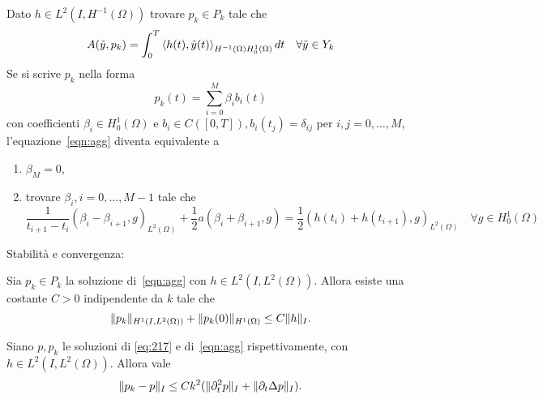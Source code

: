Dato $h\in L^2(I,H^{-1}(\Omega))$ trovare $p_k\in P_k$ tale che 
\begin{equation}
\label{eqn:agg}
A(\tilde{y},p_k)=\int^T_0 \Braket{h(t),\tilde{y}(t)}_{H^{-1}(\Omega)H^1_0(\Omega)}dt\quad\forall\tilde{y}\in Y_k
\end{equation}
Se si scrive $p_k$ nella forma 
\[
p_k(t)=\sum^M_{i=0}\beta_i b_i(t)
\]
con coefficienti $\beta_i\in H^1_0(\Omega)$ e $b_i\in C([0,T]), b_i(t_j)=\delta_{ij}$ per $i,j=0,\dots,M$, l'equazione~\eqref{eqn:agg} diventa equivalente a
\begin{enumerate}
\item $\beta_M=0$,
\item trovare $\beta_i,i=0,\dots,M-1$ tale che
\begin{equation}
\label{eqn:agg1}
\frac{1}{t_{i+1}-t_i}(\beta_i-\beta_{i+1},g)_{L^2(\Omega)} + \frac{1}{2}a(\beta_i+\beta_{i+1},g)=\frac{1}{2}(h(t_i)+h(t_{i+1}),g)_{L^2(\Omega)}\quad\forall g\in H^1_0(\Omega)
\end{equation}
\end{enumerate}
Stabilità e convergenza:
\begin{lemma}
\label{stab:agg}
Sia $p_k\in P_k$ la soluzione di~\eqref{eqn:agg} con $h\in L^2(I,L^2(\Omega))$. Allora esiste una costante $C>0$ indipendente da $k$ tale che
\[
\lVert p_k\rVert_{H^1(I,L^2(\Omega))} + \lVert p_k(0)\rVert_{H^1(\Omega)} \le C\lVert h\rVert_I.
\]
\end{lemma}
\begin{lemma}
\label{conv:agg}
Siano $p,p_k$ le soluzioni di \ref{eq:217} e di~\eqref{eqn:agg} rispettivamente, con $h\in L^2(I,L^2(\Omega))$. Allora vale
\[
\lVert p_k-p\rVert_I\le Ck^2(\lVert\partial^2_t p\rVert_I + \lVert\partial_t\Delta p\rVert_I).
\]
\end{lemma}